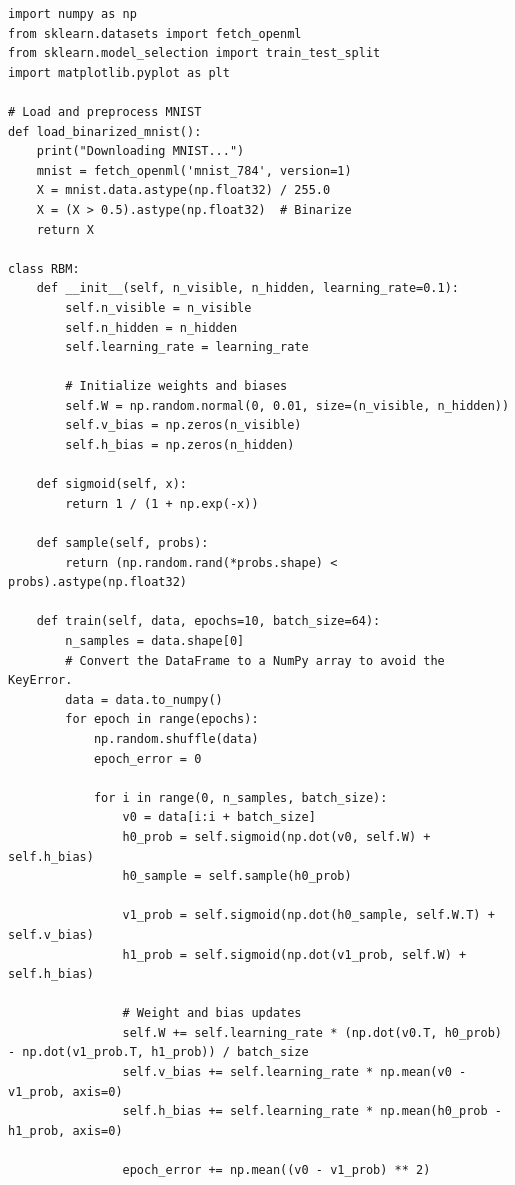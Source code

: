 \documentclass[%
oneside,                 %
final,                   %
10pt]{article}
\begin{document}
\begin{verbatim}
import numpy as np
from sklearn.datasets import fetch_openml
from sklearn.model_selection import train_test_split
import matplotlib.pyplot as plt

# Load and preprocess MNIST
def load_binarized_mnist():
    print("Downloading MNIST...")
    mnist = fetch_openml('mnist_784', version=1)
    X = mnist.data.astype(np.float32) / 255.0
    X = (X > 0.5).astype(np.float32)  # Binarize
    return X

class RBM:
    def __init__(self, n_visible, n_hidden, learning_rate=0.1):
        self.n_visible = n_visible
        self.n_hidden = n_hidden
        self.learning_rate = learning_rate

        # Initialize weights and biases
        self.W = np.random.normal(0, 0.01, size=(n_visible, n_hidden))
        self.v_bias = np.zeros(n_visible)
        self.h_bias = np.zeros(n_hidden)

    def sigmoid(self, x):
        return 1 / (1 + np.exp(-x))

    def sample(self, probs):
        return (np.random.rand(*probs.shape) < probs).astype(np.float32)

    def train(self, data, epochs=10, batch_size=64):
        n_samples = data.shape[0]
        # Convert the DataFrame to a NumPy array to avoid the KeyError.
        data = data.to_numpy()  
        for epoch in range(epochs):
            np.random.shuffle(data)
            epoch_error = 0

            for i in range(0, n_samples, batch_size):
                v0 = data[i:i + batch_size]
                h0_prob = self.sigmoid(np.dot(v0, self.W) + self.h_bias)
                h0_sample = self.sample(h0_prob)

                v1_prob = self.sigmoid(np.dot(h0_sample, self.W.T) + self.v_bias)
                h1_prob = self.sigmoid(np.dot(v1_prob, self.W) + self.h_bias)

                # Weight and bias updates
                self.W += self.learning_rate * (np.dot(v0.T, h0_prob) - np.dot(v1_prob.T, h1_prob)) / batch_size
                self.v_bias += self.learning_rate * np.mean(v0 - v1_prob, axis=0)
                self.h_bias += self.learning_rate * np.mean(h0_prob - h1_prob, axis=0)

                epoch_error += np.mean((v0 - v1_prob) ** 2)


\end{verbatim}
\end{document}
